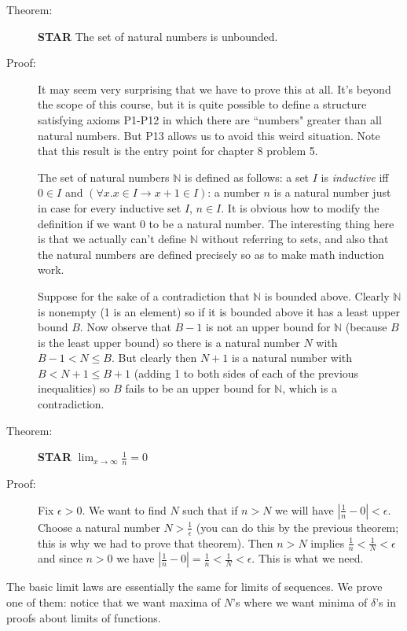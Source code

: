 \documentclass[12pt]{article}
\begin{document}
\begin{description}

\item[Theorem:]  {\bf STAR}  The set of natural numbers is unbounded.

\item[Proof:]  It may seem very surprising that we have to prove this at all.  It's beyond the scope of this course, but it is quite possible to define a structure satisfying axioms P1-P12 in which there are ``numbers" greater
than all natural numbers.  But P13 allows us to avoid this weird situation.  Note that this result is the entry point for chapter 8 problem 5.

The set of natural numbers $\mathbb N$ is defined as follows:  a set $I$ is {\em inductive\/} iff $0 \in I$ and $(\forall x.x \in I \rightarrow x+1 \in I)$:  a number $n$ is a natural number just in case for every inductive set $I$, $n \in I$.
It is obvious how to modify the definition if we want 0 to be a natural number.  The interesting thing here is that we actually can't define $\mathbb N$ without referring to sets, and also that the natural numbers are defined precisely so as to make math induction work.

Suppose for the sake of a contradiction that $\mathbb N$ is bounded above.  Clearly $\mathbb N$ is nonempty (1 is an element) so if it is bounded above it has a least upper bound $B$.  Now observe that $B-1$ is not an upper bound for
$\mathbb N$ (because $B$ is the least upper bound) so there is a natural number $N$ with $B-1 < N \leq B$.  But clearly then $N+1$ is a natural number with $B < N+1 \leq B+1$ (adding 1 to both sides of each of the previous inequalities)
so $B$ fails to be an upper bound for $\mathbb N$, which is a contradiction.

\item[Theorem:]  {\bf STAR}  $\lim_{x \rightarrow \infty} \frac1n = 0$

\item[Proof:]  Fix $\epsilon>0$.  We want to find $N$ such that if $n>N$ we will have $|\frac 1n-0|<\epsilon$.  Choose a natural number $N>\frac1{\epsilon}$ (you can do this by the previous theorem; this is why we had to prove that theorem).
Then $n>N$ implies $\frac1n<\frac1N<\epsilon$ and since $n>0$ we have $|\frac 1n-0|=\frac1n<\frac1N<\epsilon$.  This is what we need.

\end{description}

The basic limit laws are essentially the same for limits of sequences.  We prove one of them:  notice that we want maxima of $N$'s where we want minima of $\delta$'s in proofs about limits of functions.
\end{document}
